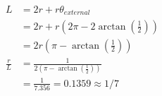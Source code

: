 \documentclass[12pt]{article}
\begin{document}
\begin{align*}
L &= 2r + r\theta_{external} \\
  &= 2r + r\left(2\pi - 2\arctan\left(\frac{1}{2}\right)\right) \\
  &= 2r\left(\pi - \arctan\left(\frac{1}{2}\right)\right) \\ 
\frac{r}{L} &= \frac{1}{2\left(\pi - \arctan\left(\frac{1}{2}\right)\right)} \\
            &= \frac{1}{7.356} = 0.1359 \approx 1/7
\end{align*}
\end{document}
